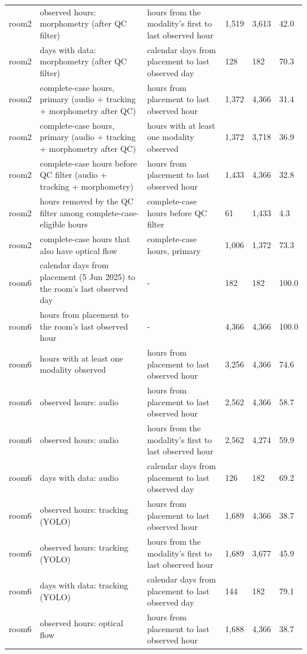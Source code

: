\begin{tabular}{llllll}
room2 & observed hours: morphometry (after QC filter) & hours from the modality's first to last observed hour & 1,519 & 3,613 & 42.0 \\
room2 & days with data: morphometry (after QC filter) & calendar days from placement to last observed day & 128 & 182 & 70.3 \\
room2 & complete-case hours, primary (audio + tracking + morphometry after QC) & hours from placement to last observed hour & 1,372 & 4,366 & 31.4 \\
room2 & complete-case hours, primary (audio + tracking + morphometry after QC) & hours with at least one modality observed & 1,372 & 3,718 & 36.9 \\
room2 & complete-case hours before QC filter (audio + tracking + morphometry) & hours from placement to last observed hour & 1,433 & 4,366 & 32.8 \\
room2 & hours removed by the QC filter among complete-case-eligible hours & complete-case hours before QC filter & 61 & 1,433 & 4.3 \\
room2 & complete-case hours that also have optical flow & complete-case hours, primary & 1,006 & 1,372 & 73.3 \\
room6 & calendar days from placement (5 Jun 2025) to the room's last observed day & - & 182 & 182 & 100.0 \\
room6 & hours from placement to the room's last observed hour & - & 4,366 & 4,366 & 100.0 \\
room6 & hours with at least one modality observed & hours from placement to last observed hour & 3,256 & 4,366 & 74.6 \\
room6 & observed hours: audio & hours from placement to last observed hour & 2,562 & 4,366 & 58.7 \\
room6 & observed hours: audio & hours from the modality's first to last observed hour & 2,562 & 4,274 & 59.9 \\
room6 & days with data: audio & calendar days from placement to last observed day & 126 & 182 & 69.2 \\
room6 & observed hours: tracking (YOLO) & hours from placement to last observed hour & 1,689 & 4,366 & 38.7 \\
room6 & observed hours: tracking (YOLO) & hours from the modality's first to last observed hour & 1,689 & 3,677 & 45.9 \\
room6 & days with data: tracking (YOLO) & calendar days from placement to last observed day & 144 & 182 & 79.1 \\
room6 & observed hours: optical flow & hours from placement to last observed hour & 1,688 & 4,366 & 38.7 \\

\end{tabular}
